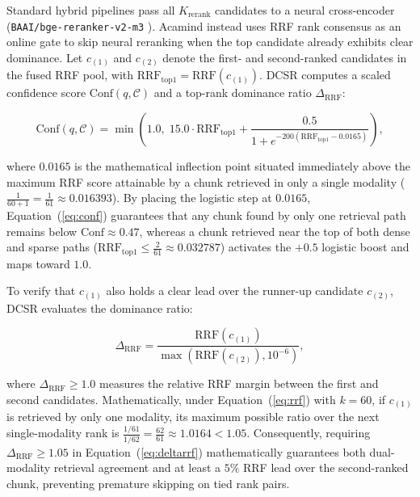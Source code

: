 \documentclass[10pt]{SPIIRAS_Proceedings}
\begin{document}
Standard hybrid pipelines pass all $K_{\mathrm{rerank}}$ candidates to a neural cross-encoder (\texttt{BAAI/bge-reranker-v2-m3} \cite{chen2024bge,xiao2023cpack,baai2024bgererankerv2m3}). Acamind instead uses RRF rank consensus as an online gate to skip neural reranking when the top candidate already exhibits clear dominance. Let $c_{(1)}$ and $c_{(2)}$ denote the first- and second-ranked candidates in the fused RRF pool, with $\mathrm{RRF}_{\mathrm{top1}} = \mathrm{RRF}(c_{(1)})$. DCSR computes a scaled confidence score $\mathrm{Conf}(q, \mathcal{C})$ and a top-rank dominance ratio $\Delta_{\mathrm{RRF}}$:

\begin{equation}
\mathrm{Conf}(q, \mathcal{C}) = \min\left(1.0, \; 15.0 \cdot \mathrm{RRF}_{\mathrm{top1}} + \frac{0.5}{1 + e^{-200(\mathrm{RRF}_{\mathrm{top1}} - 0.0165)}}\right),
\label{eq:conf}
\end{equation}

\noindent where $0.0165$ is the mathematical inflection point situated immediately above the maximum RRF score attainable by a chunk retrieved in only a single modality ($\frac{1}{60 + 1} = \frac{1}{61} \approx 0.016393$). By placing the logistic step at $0.0165$, Equation~(\ref{eq:conf}) guarantees that any chunk found by only one retrieval path remains below $\mathrm{Conf} \approx 0.47$, whereas a chunk retrieved near the top of both dense and sparse paths ($\mathrm{RRF}_{\mathrm{top1}} \le \frac{2}{61} \approx 0.032787$) activates the $+0.5$ logistic boost and maps toward $1.0$.

To verify that $c_{(1)}$ also holds a clear lead over the runner-up candidate $c_{(2)}$, DCSR evaluates the dominance ratio:

\begin{equation}
\Delta_{\mathrm{RRF}} = \frac{\mathrm{RRF}(c_{(1)})}{\max(\mathrm{RRF}(c_{(2)}), 10^{-6})},
\label{eq:deltarrf}
\end{equation}

\noindent where $\Delta_{\mathrm{RRF}} \ge 1.0$ measures the relative RRF margin between the first and second candidates. Mathematically, under Equation~(\ref{eq:rrf}) with $k = 60$, if $c_{(1)}$ is retrieved by only one modality, its maximum possible ratio over the next single-modality rank is $\frac{1/61}{1/62} = \frac{62}{61} \approx 1.0164 < 1.05$. Consequently, requiring $\Delta_{\mathrm{RRF}} \ge 1.05$ in Equation~(\ref{eq:deltarrf}) mathematically guarantees both dual-modality retrieval agreement and at least a $5\%$ RRF lead over the second-ranked chunk, preventing premature skipping on tied rank pairs.
\end{document}
